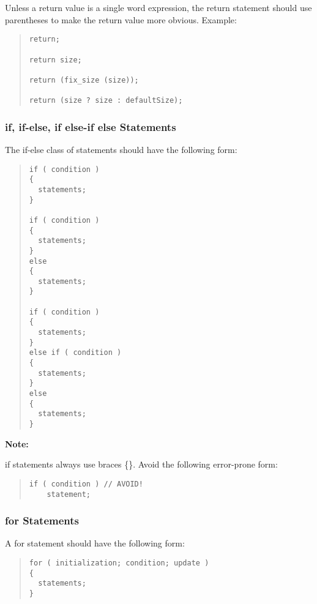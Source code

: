 \documentclass{article}
\begin{document}
Unless a return value is a single word expression, the return
statement should use parentheses to make the return value more
obvious. Example:

\begin{quote}
\begin{verbatim}
return;

return size;

return (fix_size (size));

return (size ? size : defaultSize);

\end{verbatim}
\end{quote}


\subsubsection{if, if-else, if else-if else Statements}

The if-else class of statements should have the following form: 

\begin{quote}
\begin{verbatim}
if ( condition ) 
{
  statements;
}

if ( condition ) 
{
  statements;
} 
else 
{
  statements;
}

if ( condition ) 
{
  statements;
} 
else if ( condition ) 
{
  statements;
} 
else
{
  statements;
}
\end{verbatim}
\end{quote}

\textbf{Note:}

if statements always use braces \{\}. Avoid the following error-prone
form: 

\begin{quote}
\begin{verbatim}
if ( condition ) // AVOID!
    statement;
\end{verbatim}
\end{quote}
 
\subsubsection{for Statements}

A for statement should have the following form: 

\begin{quote}
\begin{verbatim}
for ( initialization; condition; update ) 
{
  statements;
}
\end{verbatim}
\end{quote}
\end{document}

